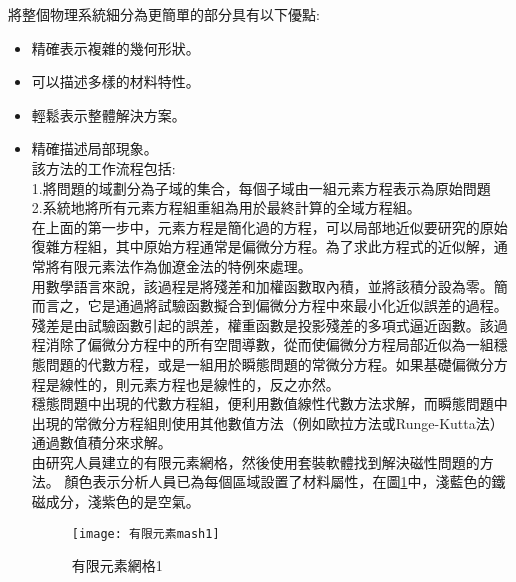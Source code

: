 將整個物理系統細分為更簡單的部分具有以下優點:\\
\begin{itemize}
\item 精確表示複雜的幾何形狀。\\
\item 可以描述多樣的材料特性。\\
\item 輕鬆表示整體解決方案。\\
\item 精確描述局部現象。\\

該方法的工作流程包括:\\

1.將問題的域劃分為子域的集合，每個子域由一組元素方程表示為原始問題\\

2.系統地將所有元素方程組重組為用於最終計算的全域方程組。\\

\qquad 在上面的第一步中，元素方程是簡化過的方程，可以局部地近似要研究的原始復雜方程組，其中原始方程通常是偏微分方程。為了求此方程式的近似解，通常將有限元素法作為伽遼金法的特例來處理。\\

\qquad 用數學語言來說，該過程是將殘差和加權函數取內積，並將該積分設為零。簡而言之，它是通過將試驗函數擬合到偏微分方程中來最小化近似誤差的過程。殘差是由試驗函數引起的誤差，權重函數是投影殘差的多項式逼近函數。該過程消除了偏微分方程中的所有空間導數，從而使偏微分方程局部近似為一組穩態問題的代數方程，或是一組用於瞬態問題的常微分方程。如果基礎偏微分方程是線性的，則元素方程也是線性的，反之亦然。\\

\qquad 穩態問題中出現的代數方程組，便利用數值線性代數方法求解，而瞬態問題中出現的常微分方程組則使用其他數值方法（例如歐拉方法或Runge-Kutta法）通過數值積分來求解。\\

\qquad 由研究人員建立的有限元素網格，然後使用套裝軟體找到解決磁性問題的方法。 顏色表示分析人員已為每個區域設置了材料屬性，在圖\ref{2.84}中，淺藍色的鐵磁成分，淺紫色的是空氣。\\
\begin{figure}[hbt!]
\begin{center}
\texttt{[image: 有限元素mash1]}
\caption{\Large 有限元素網格1}\label{2.84}
\end{center}
\end{figure}
\\


\end{itemize}
